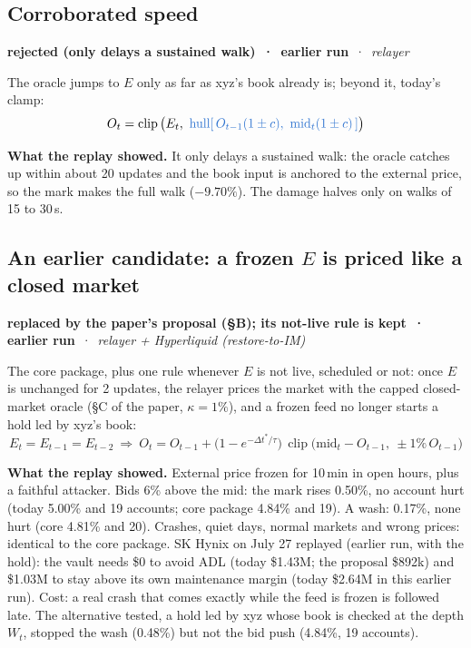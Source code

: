 \documentclass[10.5pt,a4paper]{article}
\newcommand{\chg}[1]{\ensuremath{{\color[HTML]{2F74D0}#1}}}
\newcommand{\clip}{\operatorname{clip}}
\newcommand{\st}[3]{\textcolor{#1}{\textbf{#2}} \,·\, \emph{#3}\par}
\newcommand{\res}[1]{\par\textbf{What the replay showed.} #1\par}
\begin{document}
\subsection{Corroborated speed}\label{var:auto25}
\st{rej}{rejected (only delays a sustained walk) \,·\, earlier run}{relayer}
The oracle jumps to $E$ only as far as xyz's book already is; beyond it, today's clamp:
\begin{equation}
O_t = \clip\big(E_t,\ \chg{\text{hull}[\,O_{t-1}(1\pm c),\ \text{mid}_t(1\pm c)\,]}\big)
\end{equation}
\res{It only delays a sustained walk: the oracle catches up within about 20 updates and the book input is anchored to the external price, so the mark makes the full walk ($-9.70\%$). The damage halves only on walks of 15 to 30\,s.}

\subsection{An earlier candidate: a frozen \texorpdfstring{$E$}{E} is priced like a closed market}\label{sec:lead}
\st{sup}{replaced by the paper's proposal (\S B); its not-live rule is kept \,·\, earlier run}{relayer + Hyperliquid (restore-to-IM)}
The core package, plus one rule whenever $E$ is not live, scheduled or not: once $E$ is unchanged for 2 updates, the relayer prices the market with the capped closed-market oracle (\S C of the paper, $\kappa = 1\%$), and a frozen feed no longer starts a hold led by xyz's book:
\begin{equation}
E_t = E_{t-1} = E_{t-2}\ \Rightarrow\ O_t = O_{t-1} + \big(1 - e^{-\Delta t^*/\tau}\big)\,\clip\big(\text{mid}_t - O_{t-1},\ \pm 1\%\,O_{t-1}\big)
\end{equation}
\res{External price frozen for 10\,min in open hours, plus a faithful attacker. Bids 6\% above the mid: the mark rises 0.50\%, no account hurt (today 5.00\% and 19 accounts; core package 4.84\% and 19). A wash: 0.17\%, none hurt (core 4.81\% and 20). Crashes, quiet days, normal markets and wrong prices: identical to the core package. SK Hynix on July 27 replayed (earlier run, with the hold): the vault needs \$0 to avoid ADL (today \$1.43M; the proposal \$892k) and \$1.03M to stay above its own maintenance margin (today \$2.64M in this earlier run). Cost: a real crash that comes exactly while the feed is frozen is followed late. The alternative tested, a hold led by xyz whose book is checked at the depth $W_t$, stopped the wash (0.48\%) but not the bid push (4.84\%, 19 accounts).}
\end{document}
